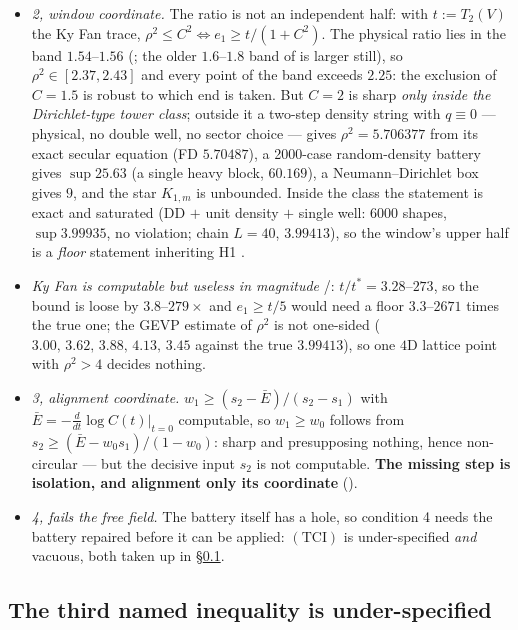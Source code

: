 \begin{itemize}
\item \emph{2, window coordinate.} The ratio is not an independent half: with $t:=T_2(V)$ the Ky Fan
  trace, $\rho^2\le C^2\iff e_1\ge t/(1+C^2)$. The physical ratio lies in the band $1.54$--$1.56$
  (; the older $1.6$--$1.8$ band of  is larger still), so
  $\rho^2\in[2.37,2.43]$ and every point of the band exceeds $2.25$: the exclusion of $C=1.5$ is robust
  to which end is taken. But $C=2$ is sharp \emph{only inside the Dirichlet-type tower class}; outside
  it a two-step density string with $q\equiv0$ --- physical, no double well, no sector choice --- gives
  $\rho^2=5.706377$ from its exact secular equation (FD $5.70487$), a 2000-case random-density battery
  gives $\sup25.63$ (a single heavy block, $60.169$), a Neumann--Dirichlet box gives $9$, and the star
  $K_{1,m}$ is unbounded. Inside the class the statement is exact and saturated (DD $+$ unit density
  $+$ single well: 6000 shapes, $\sup3.99935$, no violation; chain $L=40$, $3.99413$), so the window's
  upper half is a \emph{floor} statement inheriting H1 \LN.
\item \emph{Ky Fan is computable but useless in magnitude} \LE/\LN: $t/t^\ast=3.28$--$273$, so the
  bound is loose by $3.8$--$279\times$ and $e_1\ge t/5$ would need a floor $3.3$--$2671$ times the true
  one; the GEVP estimate of $\rho^2$ is not one-sided ($3.00,\,3.62,\,3.88,\,4.13,\,3.45$ against the
  true $3.99413$), so one $4$D lattice point with $\rho^2>4$ decides nothing.
\item \emph{3, alignment coordinate.} $w_1\ge(s_2-\bar E)/(s_2-s_1)$ with
  $\bar E=-\tfrac{d}{dt}\log C(t)|_{t=0}$ computable, so $w_1\ge w_0$ follows from
  $s_2\ge(\bar E-w_0s_1)/(1-w_0)$: sharp and presupposing nothing, hence non-circular --- but the
  decisive input $s_2$ is not computable. \textbf{The missing step is isolation, and alignment only
  its coordinate} ().
\item \emph{4, fails the free field.} The battery itself has a hole, so condition 4 needs the battery
  repaired before it can be applied: $(\mathrm{TCI})$ is under-specified \emph{and} vacuous, both taken
  up in \S\ref{sec:tci-under}.
\end{itemize}

\subsection{The third named inequality is under-specified}
\label{sec:tci-under}

